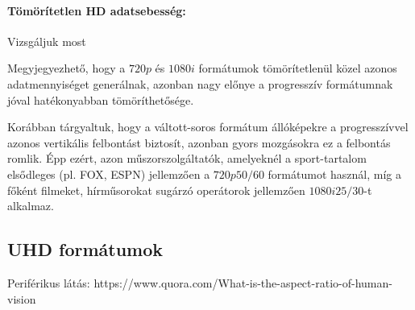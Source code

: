 \paragraph{Tömörítetlen HD adatsebesség:\\}

Vizsgáljuk most 



Megyjegyezhető, hogy a $720p$ és $1080i$ formátumok tömörítetlenül közel azonos adatmennyiséget generálnak, azonban nagy előnye a progresszív formátumnak jóval hatékonyabban tömöríthetősége.

Korábban tárgyaltuk, hogy a váltott-soros formátum állóképekre a progresszívvel azonos vertikális felbontást biztosít, azonban gyors mozgásokra ez a felbontás romlik.
Épp ezért, azon műszorszolgáltatók, amelyeknél a sport-tartalom elsődleges (pl. FOX, ESPN) jellemzően a $720p50/60$ formátumot használ, míg a főként filmeket, hírműsorokat sugárzó operátorok jellemzően $1080i25/30$-t alkalmaz.

%
%
%


\subsection{UHD formátumok}

Periférikus látás:
https://www.quora.com/What-is-the-aspect-ratio-of-human-vision